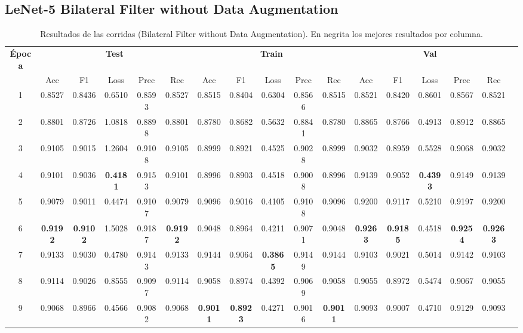 \documentclass[conference]{IEEEtran}
\begin{document}
\subsection{LeNet-5 Bilateral Filter without Data Augmentation}
\begin{table}[h]
\scriptsize
\caption{Resultados de las corridas (Bilateral Filter without Data Augmentation). En negrita los mejores resultados por columna.}
\centering
\begin{tabular}{|c|c|c|c|c|c|c|c|c|c|c|c|c|c|c|c|c|}
\hline
\textbf{Época} & \multicolumn{5}{c|}{\textbf{Test}} & \multicolumn{5}{c|}{\textbf{Train}} & \multicolumn{5}{c|}{\textbf{Val}} \\
\cline{2-16}
 & Acc & F1 & Loss & Prec & Rec & Acc & F1 & Loss & Prec & Rec & Acc & F1 & Loss & Prec & Rec \\
\hline
1 & 0.8527 & 0.8436 & 0.6510 & 0.8593 & 0.8527 & 0.8515 & 0.8404 & 0.6304 & 0.8566 & 0.8515 & 0.8521 & 0.8420 & 0.8601 & 0.8567 & 0.8521 \\
2 & 0.8801 & 0.8726 & 1.0818 & 0.8898 & 0.8801 & 0.8780 & 0.8682 & 0.5632 & 0.8841 & 0.8780 & 0.8865 & 0.8766 & 0.4913 & 0.8912 & 0.8865 \\
3 & 0.9105 & 0.9015 & 1.2604 & 0.9108 & 0.9105 & 0.8999 & 0.8921 & 0.4525 & 0.9028 & 0.8999 & 0.9032 & 0.8959 & 0.5528 & 0.9068 & 0.9032 \\
4 & 0.9101 & 0.9036 & \textbf{0.4181} & 0.9153 & 0.9101 & 0.8996 & 0.8903 & 0.4518 & 0.9008 & 0.8996 & 0.9139 & 0.9052 & \textbf{0.4393} & 0.9149 & 0.9139 \\
5 & 0.9079 & 0.9011 & 0.4474 & 0.9107 & 0.9079 & 0.9096 & 0.9016 & 0.4105 & 0.9108 & 0.9096 & 0.9200 & 0.9117 & 0.5210 & 0.9197 & 0.9200 \\
6 & \textbf{0.9192} & \textbf{0.9102} & 1.5028 & 0.9187 & \textbf{0.9192} & 0.9048 & 0.8964 & 0.4211 & 0.9071 & 0.9048 & \textbf{0.9263} & \textbf{0.9185} & 0.4518 & \textbf{0.9254} & \textbf{0.9263} \\
7 & 0.9133 & 0.9030 & 0.4780 & 0.9143 & 0.9133 & 0.9144 & 0.9064 & \textbf{0.3865} & 0.9149 & 0.9144 & 0.9103 & 0.9021 & 0.5014 & 0.9142 & 0.9103 \\
8 & 0.9114 & 0.9026 & 0.8555 & 0.9097 & 0.9114 & 0.9058 & 0.8974 & 0.4392 & 0.9069 & 0.9058 & 0.9055 & 0.8972 & 0.5474 & 0.9067 & 0.9055 \\
9 & 0.9068 & 0.8966 & 0.4566 & 0.9082 & 0.9068 & \textbf{0.9011} & \textbf{0.8923} & 0.4271 & 0.9016 & \textbf{0.9011} & 0.9093 & 0.9007 & 0.4710 & 0.9129 & 0.9093 \\
\hline
\end{tabular}
\label{tab:bilateral_noaug_results}
\end{table}
\end{document}
